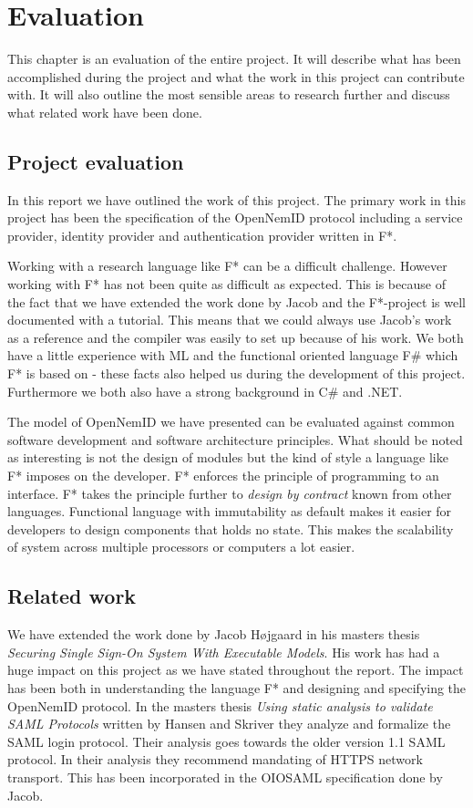 \documentclass[twosided]{report}
\begin{document}
\chapter{Evaluation}
This chapter is an evaluation of the entire project. It will describe what has been accomplished during the project and what the work in this project can contribute with. It will also outline the most sensible areas to research further and discuss what related work have been done.
\section{Project evaluation}
In this report we have outlined the work of this project. The primary work in this project has been the specification of the OpenNemID protocol including a service provider, identity provider and authentication provider written in F*.
\par
Working with a research language like F* can be a difficult challenge. However working with F* has not been quite as difficult as expected. This is because of the fact that we have extended the work done by Jacob and the F*-project is well documented with a tutorial. This means that we could always use Jacob's work as a reference and the compiler was easily to set up because of his work. We both have a little experience with ML and the functional oriented language F\# which F* is based on - these facts also helped us during the development of this project. Furthermore we both also have a strong background in C\# and .NET.
\par
The model of OpenNemID we have presented can be evaluated against common software development and software architecture principles. What should be noted as interesting is not the design of modules but the kind of style a language like F* imposes on the developer. F* enforces the principle of programming to an interface. F* takes the principle further to \emph{design by contract} known from other languages. Functional language with immutability as default makes it easier for developers to design components that holds no state. This makes the scalability of system across multiple processors or computers a lot easier.
\section{Related work}
We have extended the work done by Jacob H{\o}jgaard \cite{jacob} in his masters thesis \emph{Securing Single Sign-On System With Executable Models}. His work has had a huge impact on this project as we have stated throughout the report. The impact has been both in understanding the language F* and designing and specifying the OpenNemID protocol. In the masters thesis \emph{Using static analysis to validate SAML Protocols} written by Hansen and Skriver \cite{HansenSkriver} they analyze and formalize the SAML login protocol. Their analysis goes towards the older version 1.1 SAML protocol. In their analysis they recommend mandating of HTTPS network transport. This has been incorporated in the OIOSAML specification done by Jacob.
\end{document}
